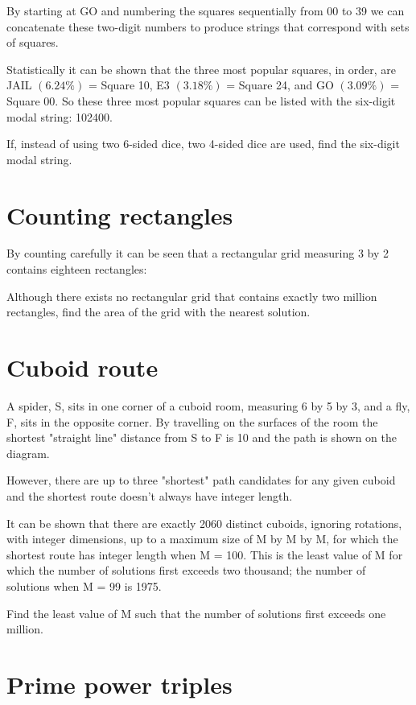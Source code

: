 By starting at GO and numbering the squares sequentially from 00 to 39 we can concatenate these two-digit numbers to produce strings that correspond with sets of squares.

Statistically it can be shown that the three most popular squares, in order, are JAIL $(6.24\%)$ = Square 10, E3 $(3.18\%)$ = Square 24, and GO $(3.09\%)$ = Square 00. So these three most popular squares can be listed with the six-digit modal string: 102400.

If, instead of using two 6-sided dice, two 4-sided dice are used, find the six-digit modal string.

\section{Counting rectangles} \label{pb.085}

By counting carefully it can be seen that a rectangular grid measuring 3 by 2 contains eighteen rectangles:


Although there exists no rectangular grid that contains exactly two million rectangles, find the area of the grid with the nearest solution.

\section{Cuboid route} \label{pb.086}

A spider, S, sits in one corner of a cuboid room, measuring 6 by 5 by 3, and a fly, F, sits in the opposite corner. By travelling on the surfaces of the room the shortest "straight line" distance from S to F is 10 and the path is shown on the diagram.


However, there are up to three "shortest" path candidates for any given cuboid and the shortest route doesn't always have integer length.

It can be shown that there are exactly 2060 distinct cuboids, ignoring rotations, with integer dimensions, up to a maximum size of M by M by M, for which the shortest route has integer length when M = 100. This is the least value of M for which the number of solutions first exceeds two thousand; the number of solutions when M = 99 is 1975.

Find the least value of M such that the number of solutions first exceeds one million.

\section{Prime power triples} \label{pb.087}

